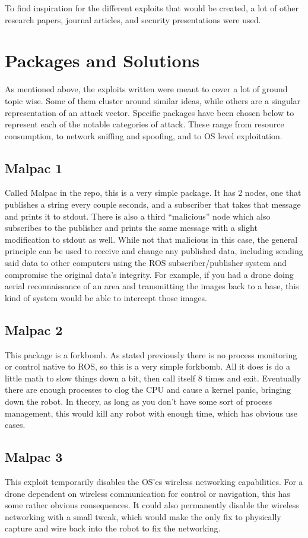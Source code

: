 \documentclass[IEEEtran,letterpaper,10pt,notitlepage,draftclsnofoot,onecolumn]{article}
\begin{document}
To find inspiration for the different exploits that would be created, a lot of other research papers, journal articles, and security presentations were used. 

\section{Packages and Solutions}
As mentioned above, the exploits written were meant to cover a lot of ground topic wise.
Some of them cluster around similar ideas, while others are a singular representation of an attack vector. 
Specific packages have been chosen below to represent each of the notable categories of attack.
These range from resource consumption, to network sniffing and spoofing, and to OS level exploitation.

\subsection{Malpac 1}
Called Malpac in the repo, this is a very simple package. It has 2 nodes, one that publishes a string every couple seconds, and a subscriber that takes that message and prints it to stdout. 
There is also a third “malicious” node which also subscribes to the publisher and prints the same message with a slight modification to stdout as well. 
While not that malicious in this case, the general principle can be used to receive and change any published data, including sending said data to other computers using the ROS subscriber/publisher system and compromise the original data’s integrity. 
For example, if you had a drone doing aerial reconnaissance of an area and transmitting the images back to a base, this kind of system would be able to intercept those images.

\subsection{Malpac 2}
This package is a forkbomb. 
As stated previously there is no process monitoring or control native to ROS, so this is a very simple forkbomb. All it does is do a little math to slow things down a bit, then call itself 8 times and exit. 
Eventually there are enough processes to clog the CPU and cause a kernel panic, bringing down the robot. 
In theory, as long as you don’t have some sort of process management, this would kill any robot with enough time, which has obvious use cases.

\subsection{Malpac 3}
This exploit temporarily disables the OS’es wireless networking capabilities. 
For a drone dependent on wireless communication for control or navigation, this has some rather obvious consequences. 
It could also permanently disable the wireless networking with a small tweak, which would make the only fix to physically capture and wire back into the robot to fix the networking. 
\end{document}
